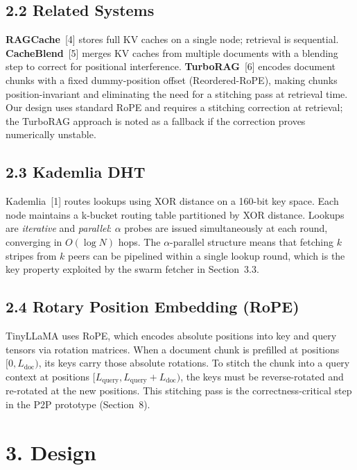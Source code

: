\documentclass[11pt]{article}
\begin{document}
\subsection{2.2 Related Systems}

\textbf{RAGCache}~[4] stores full KV caches on a single node; retrieval
is sequential. \textbf{CacheBlend}~[5] merges KV caches from multiple
documents with a blending step to correct for positional interference.
\textbf{TurboRAG}~[6] encodes document chunks with a fixed dummy-position
offset (Reordered-RoPE), making chunks position-invariant and eliminating
the need for a stitching pass at retrieval time. Our design uses standard
RoPE and requires a stitching correction at retrieval; the TurboRAG
approach is noted as a fallback if the correction proves numerically
unstable.

\subsection{2.3 Kademlia DHT}

Kademlia~[1] routes lookups using XOR distance on a 160-bit key space.
Each node maintains a k-bucket routing table partitioned by XOR distance.
Lookups are \emph{iterative} and \emph{parallel}: $\alpha$ probes are
issued simultaneously at each round, converging in $O(\log N)$ hops. The
$\alpha$-parallel structure means that fetching $k$ stripes from $k$ peers
can be pipelined within a single lookup round, which is the key property
exploited by the swarm fetcher in Section~3.3.

\subsection{2.4 Rotary Position Embedding (RoPE)}

TinyLLaMA uses RoPE, which encodes absolute positions into key and query
tensors via rotation matrices. When a document chunk is prefilled at
positions $[0, L_\text{doc})$, its keys carry those absolute rotations.
To stitch the chunk into a query context at positions $[L_\text{query},
L_\text{query} + L_\text{doc})$, the keys must be reverse-rotated and
re-rotated at the new positions. This stitching pass is the
correctness-critical step in the P2P prototype (Section~8).

\section{3. Design}
\end{document}
